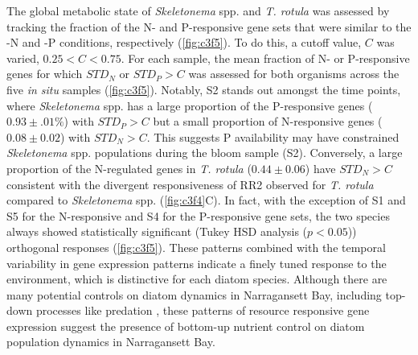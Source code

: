 The global metabolic state of \textit{Skeletonema} spp. and \textit{T. rotula} was assessed by tracking the fraction of the N- and P-responsive gene sets that were similar to the -N and -P conditions, respectively (\cref{fig:c3f5}).  To do this, a cutoff value, $C$ was varied, $0.25 < C < 0.75$. For each sample, the mean fraction of N- or P-responsive genes for which $STD_N$ or $STD_P > C$ was assessed for both organisms across the five \textit{in situ} samples (\cref{fig:c3f5}). Notably, S2 stands out amongst the time points, where \textit{Skeletonema} spp. has a large proportion of the P-responsive genes ($0.93 \pm .01\%$) with $STD_P > C$ but a small proportion of N-responsive genes ($0.08 \pm 0.02$) with $STD_N > C$. This suggests P availability may have constrained \textit{Skeletonema} spp. populations during the bloom sample (S2). Conversely, a large proportion of the N-regulated genes in \textit{T. rotula} ($0.44 \pm 0.06$) have $STD_N > C$ consistent with the divergent responsiveness of RR2 observed for \textit{T. rotula} compared to \textit{Skeletonema} spp. (\cref{fig:c3f4}C). In fact, with the exception of S1 and S5 for the N-responsive and S4 for the P-responsive gene sets, the two species always showed statistically significant (Tukey HSD analysis ($p<0.05$)) orthogonal responses (\cref{fig:c3f5}). These patterns combined with the temporal variability in gene expression patterns indicate a finely tuned response to the environment, which is distinctive for each diatom species. Although there are many potential controls on diatom dynamics in Narragansett Bay, including top-down processes like predation \citep{Martin1970, Lawerence2012}, these patterns of resource responsive gene expression suggest the presence of bottom-up nutrient control on diatom population dynamics in Narragansett Bay.\par

